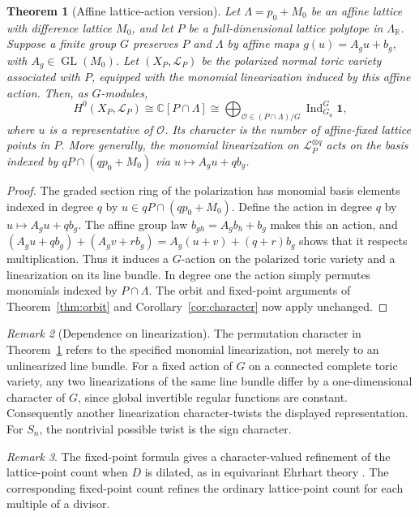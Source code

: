 \documentclass[12pt,letterpaper]{article}
\newtheorem{theorem}{Theorem}[section]
\theoremstyle{definition}
\theoremstyle{remark}
\newtheorem{remark}[theorem]{Remark}
\numberwithin{equation}{section}
\DeclareMathOperator{\Ind}{Ind}
\newcommand{\CC}{\mathbb C}
\newcommand{\LL}{\mathcal L}
\newcommand{\bfone}{\mathbf 1}
\begin{document}
\begin{theorem}[Affine lattice-action version]\label{thm:affine}
Let $\Lambda=p_0+M_0$ be an affine lattice with difference lattice $M_0$, and let $P$ be a full-dimensional lattice polytope in $\Lambda_{\mathbb R}$. Suppose a finite group $G$ preserves $P$ and $\Lambda$ by affine maps $g(u)=A_gu+b_g$, with $A_g\in\operatorname{GL}(M_0)$. Let $(X_P,\LL_P)$ be the polarized normal toric variety associated with $P$, equipped with the \emph{monomial linearization} induced by this affine action. Then, as $G$-modules,
\begin{equation}\label{eq:affine-orbits}
H^0(X_P,\LL_P)\cong\CC[P\cap\Lambda]
\cong\bigoplus_{\mathcal O\in(P\cap\Lambda)/G}\Ind_{G_u}^G\bfone,
\end{equation}
where $u$ is a representative of $\mathcal O$. Its character is the number of affine-fixed lattice points in $P$. More generally, the monomial linearization on $\LL_P^{\otimes q}$ acts on the basis indexed by $qP\cap(qp_0+M_0)$ via $u\mapsto A_gu+qb_g$.
\end{theorem}
\begin{proof}
The graded section ring of the polarization has monomial basis elements indexed in degree $q$ by $u\in qP\cap(qp_0+M_0)$. Define the action in degree $q$ by $u\mapsto A_gu+qb_g$. The affine group law $b_{gh}=A_gb_h+b_g$ makes this an action, and
$(A_gu+qb_g)+(A_gv+rb_g)=A_g(u+v)+(q+r)b_g$
shows that it respects multiplication. Thus it induces a $G$-action on the polarized toric variety and a linearization on its line bundle. In degree one the action simply permutes monomials indexed by $P\cap\Lambda$. The orbit and fixed-point arguments of Theorem~\ref{thm:orbit} and Corollary~\ref{cor:character} now apply unchanged.
\end{proof}
\begin{remark}[Dependence on linearization]\label{rem:linearization}
The permutation character in Theorem~\ref{thm:affine} refers to the specified monomial linearization, not merely to an unlinearized line bundle. For a fixed action of $G$ on a connected complete toric variety, any two linearizations of the same line bundle differ by a one-dimensional character of $G$, since global invertible regular functions are constant. Consequently another linearization character-twists the displayed representation. For $S_n$, the nontrivial possible twist is the sign character.
\end{remark}

\begin{remark}
The fixed-point formula gives a character-valued refinement of the lattice-point count when $D$ is dilated, as in equivariant Ehrhart theory \cite{St11,EKS24}. The corresponding fixed-point count refines the ordinary lattice-point count for each multiple of a divisor.
\end{remark}
\end{document}
